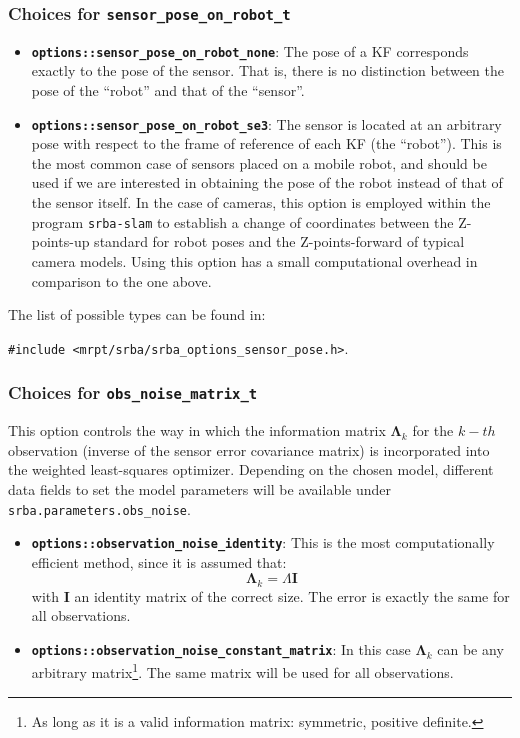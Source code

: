\documentclass[a4paper,11pt]{article}
\begin{document}
\subsubsection{Choices for \texttt{sensor\_pose\_on\_robot\_t}}

\begin{itemize}
\item{\textbf{ \texttt{options::sensor\_pose\_on\_robot\_none}}: The pose of a KF corresponds exactly to the pose of the 
sensor. That is, 
there is no distinction between the pose of the ``robot'' and that of the ``sensor''.}
\item{\textbf{ \texttt{options::sensor\_pose\_on\_robot\_se3}}: The sensor is located at an arbitrary pose with respect to 
the frame of reference of each KF (the ``robot''). This is the most common case of sensors placed on a mobile robot, 
and should be used if we are interested in obtaining the pose of the robot instead of that of the sensor itself. 
In the case of cameras, this option is employed within the program \texttt{srba-slam} to establish a change of coordinates
between the Z-points-up standard for robot poses and the Z-points-forward of typical camera models. 
Using this option has a small computational overhead in comparison to the one above.}
\end{itemize}

The list of possible types can be found in: 

\texttt{\#include <mrpt/srba/srba\_options\_sensor\_pose.h>}.


\subsubsection{Choices for \texttt{obs\_noise\_matrix\_t}}

This option controls the way in which the information matrix $\boldsymbol \Lambda_k$ for the $k-th$ observation 
(inverse of the sensor error
covariance matrix) is incorporated into the weighted least-squares optimizer.
Depending on the chosen model, different data fields to set the model parameters 
will be available under \texttt{srba.parameters.obs\_noise}.

\begin{itemize}
\item{\textbf{ \texttt{options::observation\_noise\_identity}}: 
This is the most computationally efficient method, since it is assumed that:
  \begin{equation}
  \boldsymbol \Lambda_k = \Lambda \mathbf{I}
  \end{equation}
\noindent with $\mathbf{I}$ an identity matrix of the correct size. 
The error is exactly the same for all observations.}

\item{\textbf{ \texttt{options::observation\_noise\_constant\_matrix}}: 
In this case $\boldsymbol \Lambda_k$ can be any arbitrary matrix\footnote{As long
as it is a valid information matrix: symmetric, positive definite.}. The same 
matrix will be used for all observations.}

\end{itemize}
\end{document}
